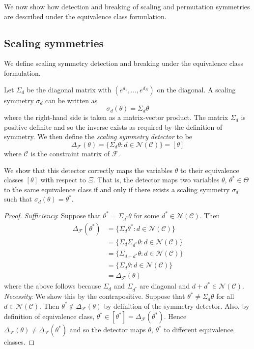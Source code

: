We now show how detection and breaking of scaling and permutation symmetries are described under the equivalence class formulation.


\subsection{Scaling symmetries}

We define scaling symmetry detection and breaking under the equivalence class formulation.

\begin{defn}
Let $\Sigma_d$ be the diagonal matrix with $(e^{d_1},...,e^{d_N})$ on the diagonal. A scaling symmetry $\sigma_d$ can be written as
\[
\sigma_d(\theta)=\Sigma_d\theta
\]
where the right-hand side is taken as a matrix-vector product. The matrix $\Sigma_d$ is positive definite and so the inverse exists as required by the definition of symmetry. We then define the \textit{scaling symmetry detector} to be
\[
\Delta_\mathcal{F}(\theta) = \{\Sigma_d\theta:d\in\mathcal{N}(\mathcal{C})\}=[\theta]
\]
where $\mathcal{C}$ is the constraint matrix of $\mathcal{F}$.
\end{defn}

\noindent We show that this detector correctly maps the variables $\theta$ to their equivalence classes $[\theta]$ with respect to $\Xi$. That is, the detector maps two variables $\theta$, $\theta^*\in\Theta$ to the same equivalence class if and only if there exists a scaling symmetry $\sigma_d$ such that $\sigma_d(\theta)=\theta^*$.

\begin{proof}
\textit{Sufficiency}: Suppose that $\theta^*=\Sigma_{d^*}\theta$ for some $d^*\in\mathcal{N}(\mathcal{C})$. Then
\begin{align*}
\Delta_\mathcal{F}(\theta^*) &= \{\Sigma_d\theta^*:d\in\mathcal{N}(\mathcal{C})\} \\
&= \{\Sigma_d\Sigma_{d^*}\theta:d\in\mathcal{N}(\mathcal{C})\} \\
&= \{\Sigma_{d+d^*}\theta:d\in\mathcal{N}(\mathcal{C})\} \\
&= \{\Sigma_d\theta:d\in\mathcal{N}(\mathcal{C})\} \\
&= \Delta_\mathcal{F}(\theta)
\end{align*}
where the above follows because $\Sigma_d$ and $\Sigma_{d^*}$ are diagonal and $d+d^*\in\mathcal{N}(\mathcal{C})$.
\\

\noindent \textit{Necessity}: We show this by the contrapositive. Suppose that $\theta^*\neq\Sigma_{d}\theta$ for all $d\in\mathcal{N}(\mathcal{C})$. Then $\theta^*\notin\Delta_\mathcal{F}(\theta)$ by definition of the symmetry detector. Also, by definition of equivalence class, $\theta^*\in[\theta^*]=\Delta_\mathcal{F}(\theta^*)$. Hence $\Delta_\mathcal{F}(\theta)\neq\Delta_\mathcal{F}(\theta^*)$ and so the detector maps $\theta$, $\theta^*$ to different equivalence classes.
\end{proof}

